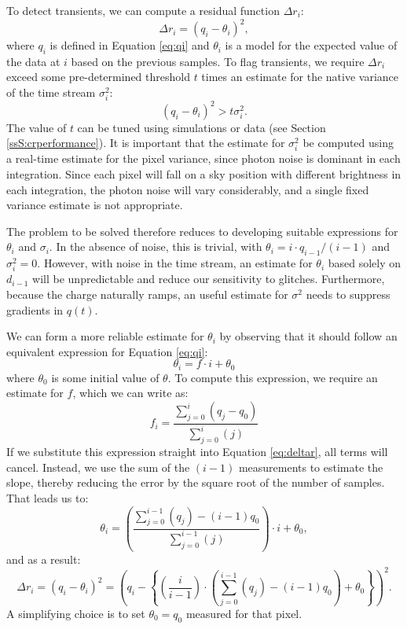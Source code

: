 \documentclass{ws-jai}
\begin{document}
To detect transients, we can compute a residual function $\Delta r_{i}$:
%
\begin{equation}
  \label{eq:deltar}
  \Delta r_{i} = (q_{i} - \theta_{i})^{2}, 
\end{equation}
%
where $q_{i}$ is defined in Equation \ref{eq:qi} and $\theta_{i}$ is a
model for the expected value of the data at $i$ based on the previous
samples.  To flag transients, we require $\Delta r_{i}$ exceed some
pre-determined threshold $t$ times an estimate for the native variance
of the time stream $\sigma^{2}_{i}$:
%
\begin{equation}
  \label{eq:estimate}
  (q_{i} - \theta_{i})^{2} > t \sigma^{2}_{i}.
\end{equation}
%
The value of $t$ can be tuned using simulations or data (see Section
\ref{ssS:crperformance}).  It is important that the estimate for
$\sigma_{i}^{2}$ be computed using a real-time estimate for the pixel
variance, since photon noise is dominant in each integration.  Since
each pixel will fall on a sky position with different brightness in
each integration, the photon noise will vary considerably, and a
single fixed variance estimate is not appropriate.

The problem to be solved therefore reduces to developing
suitable expressions for $\theta_{i}$ and $\sigma_{i}$.  In the
absence of noise, this is trivial, with
$\theta_{i} = i \cdot q_{i-1} / (i-1)$ and $\sigma^{2}_{i} = 0$.  However,
with noise in the time stream, an estimate for $\theta_{i}$ based
solely on $d_{i-1}$ will be unpredictable and reduce our sensitivity
to glitches.  Furthermore, because the charge naturally ramps, an useful
estimate for $\sigma^{2}$ needs to suppress gradients in $q(t)$.

We can form a more reliable estimate for $\theta_{i}$ by observing
that it should follow an equivalent expression for Equation
\ref{eq:qi}:
%
\begin{equation}
\theta_{i} = f \cdot i + \theta_{0}
\end{equation}
%
where $\theta_{0}$ is some initial value of $\theta$.  To compute this
expression, we require an estimate for $f$, which we can write as:
%
\begin{equation}
f_{i} = \frac{\sum_{j=0}^{i}(q_{j} - q_{0})}{\sum_{j=0}^{i} (j)}
\end{equation}
%
If we substitute this expression straight into Equation
\ref{eq:deltar}, all terms will cancel.  Instead, we use the sum of the
$(i-1)$ measurements to estimate the slope, thereby reducing the error
by the square root of the number of samples.  That leads us to:
%
\begin{equation}
  \theta_{i} = \left( \frac{\sum_{j=0}^{i-1}(q_{j}) - (i-1)
    q_{0}}{\sum_{j=0}^{i-1}(j)} \right) \cdot i + \theta_{0},
\end{equation}  
%
and as a result:
%
\begin{equation}
  \Delta r_{i} = (q_{i} - \theta_{i})^{2} = \left( q_{i} -
  \left\{ \left(\frac{i}{i-1}
  \right) \cdot (\sum_{j=0}^{i-1}(q_{j}) - (i-1) q_{0}) + \theta_{0} \right\}
  \right)^{2} .
\end{equation}
%
A simplifying choice is to set $\theta_{0}=q_{0}$ measured for that pixel.
\end{document}
